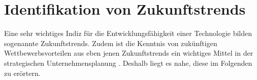 \section{Identifikation von Zukunftstrends}
\label{futuretrends}

Eine sehr wichtiges Indiz für die Entwicklungsfähigkeit einer Technologie bilden sogenannte Zukunftstrends. Zudem ist die Kenntnis von zukünftigen Wettbewerbsvorteilen aus eben jenen Zukunftstrends ein wichtiges Mittel in der strategischen Unternehmensplanung \cite{mietzner}. Deshalb liegt es nahe, diese im Folgenden zu erörtern.